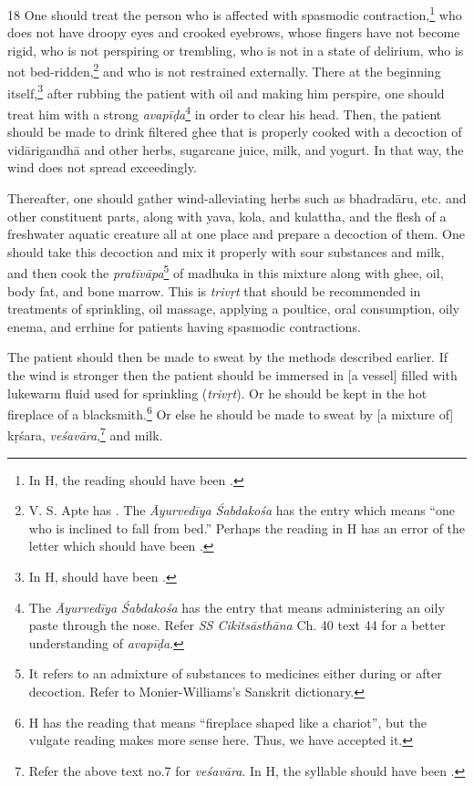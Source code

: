 \begin{translation}
    \item[18]
    One should treat the person who is affected with spasmodic 
    contraction,\footnote{In H, the reading  should have been 
    .} who does not have droopy eyes and crooked eyebrows, 
    whose fingers have not become rigid, who is not perspiring or trembling, who is 
    not in a state of delirium, who is not bed-ridden,\footnote{V. S. Apte has 
    . The \textit{Āyurvedīya \'{S}abdakośa} has the entry 
     which means \enquote{one who is inclined to fall from 
    bed.} Perhaps the reading in H has an error of the letter  which 
    should have been .} and who is not restrained externally. There at 
    the beginning itself,\footnote{In H,  should have been 
    .} after rubbing the patient with oil and making him perspire, 
    one should treat him with a strong \textit{avapīḍa}\footnote{The 
    \textit{Āyurvedīya \'{S}abdakośa} has the entry  that means 
    administering an oily paste through the nose. Refer \textit{SS Cikitsāsthāna} 
    Ch. 40 text 44 for a better understanding of \textit{avapīḍa}.} in 
    order to clear his head. Then, the patient should be made to drink filtered ghee 
    that is properly cooked with a decoction of \gls{vidārigandhā} and other herbs, 
    sugarcane juice, milk, and yogurt. In that way, the wind does not spread 
    exceedingly. 

    Thereafter, one should gather wind-alleviating herbs such as \gls{bhadradāru}, etc. and other constituent parts, along with \gls{yava}, \gls{kola}, and \gls{kulattha}, and the flesh of a freshwater aquatic creature all at one place and prepare a decoction of them. One should take this decoction and mix it properly with sour substances and milk, and then cook the \textit{pratīvāpa}\footnote{It refers to an admixture of substances to medicines either during or after decoction. Refer to Monier-Williams's Sanskrit dictionary.} of \gls{madhuka} in this mixture along with ghee, oil, body fat, and bone marrow. This is \textit{trivṛt} that should be recommended in treatments of sprinkling, oil massage, applying a poultice, oral consumption, oily enema, and errhine for patients having spasmodic contractions.

    The patient should then be made to sweat by the methods described earlier. If the wind is stronger then the patient should be immersed in [a vessel] filled with lukewarm fluid used for sprinkling (\textit{trivṛt}). Or he should be kept in the hot fireplace of a blacksmith.\footnote{H has the reading  that means \enquote{fireplace shaped like a chariot}, but the vulgate reading  makes more sense here. Thus, we have accepted it.} Or else he should be made to sweat by [a mixture of] \gls{kṛśara}, \textit{veśavāra},\footnote{Refer the above text no.7 for \textit{veśavāra}. In H, the syllable  should have been .} and milk.
 

\end{translation}
